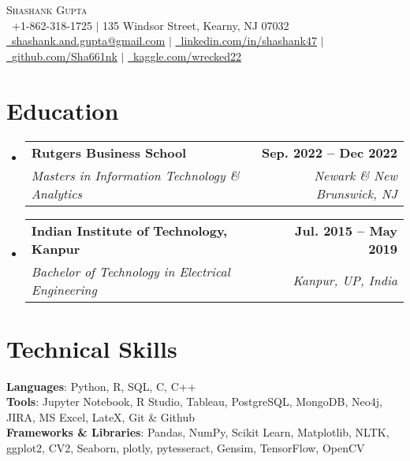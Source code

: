 \documentclass[letterpaper,11pt]{article}
\makeatletter
\newcommand{\resumeSubheading}[4]{
  \vspace{-2pt}\item
    \begin{tabular*}{1.0\textwidth}[t]{l@{\extracolsep{\fill}}r}
      \textbf{#1} & \textbf{\small #2} \\
      \textit{\small#3} & \textit{\small #4} \\
    \end{tabular*}\vspace{-7pt}
}
\newcommand{\resumeSubHeadingListStart}{\begin{itemize}[leftmargin=0.0in, label={}]}
\newcommand{\resumeSubHeadingListEnd}{\end{itemize}}
\makeatother
\begin{document}

\begin{center}
    {\Huge \scshape Shashank Gupta} \\ \vspace{1pt}
    \small \raisebox{-0.1\height}\faPhone\ +1-862-318-1725 $|$ 135 Windsor Street, Kearny, NJ 07032 \\ \vspace{1pt}
     \href{mailto:shashank.and.gupta@gmail.com}{\raisebox{-0.2\height}\faEnvelope\  \underline{shashank.and.gupta@gmail.com}} $|$ 
    \href{https://www.linkedin.com/in/shashank47/}{\raisebox{-0.2\height}\faLinkedin\ \underline{linkedin.com/in/shashank47}} $|$
    \href{https://github.com/Sha661nk}{\raisebox{-0.2\height}\faGithub\ \underline{github.com/Sha661nk}} $|$ \href{https://www.kaggle.com/wrecked22}{\raisebox{-0.1\height}\faKaggle\ \underline{kaggle.com/wrecked22}}
    \vspace{-8pt}
\end{center}


\section{Education}
  \resumeSubHeadingListStart
    \resumeSubheading
      {Rutgers Business School}{Sep. 2022 -- Dec 2022}
      {Masters in Information Technology \& Analytics}{Newark \& New Brunswick, NJ}
      
    \resumeSubheading
      {Indian Institute of Technology, Kanpur}{Jul. 2015 -- May 2019}
      {Bachelor of Technology in Electrical Engineering}{Kanpur, UP, India}
  \resumeSubHeadingListEnd

\section{Technical Skills}
 \begin{itemize}[leftmargin=0.15in, label={}]
    \small{\item{
     \textbf{Languages}{: Python, R, SQL, C, C++} \\
     \textbf{Tools}{: Jupyter Notebook, R Studio, Tableau, PostgreSQL, MongoDB, Neo4j, JIRA, MS Excel, LateX, Git \& Github} \\
     \textbf{Frameworks \& Libraries}{: Pandas, NumPy, Scikit Learn, Matplotlib, NLTK, ggplot2, CV2, Seaborn, plotly, pytesseract, Gensim, TensorFlow, OpenCV} \\
    }}
 \end{itemize}
 \vspace{-16pt}
\end{document}
